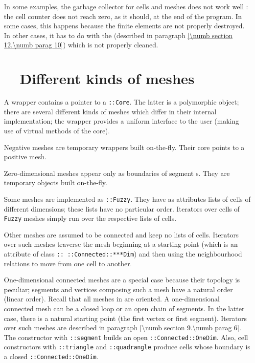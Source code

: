 In some examples, the garbage collector for cells and meshes does not work well :
the cell counter does not reach zero, as it should, at the end of the program.
In some cases, this happens because the finite elements are not properly destroyed.
In other cases, it has to do with the {\small\tt{}} (described in
paragraph \ref{\numb section 12.\numb parag 10}) which is not properly cleaned.


\section{~~Different kinds of meshes}\label{\numb section 11.\numb parag 6}   

A {\small\tt {}} wrapper contains a pointer to a {\small\tt {}::Core}.
The latter is a polymorphic object; there are several different kinds of meshes
which differ in their internal implementation; the wrapper provides a uniform interface
to the user (making use of virtual methods of the core).

Negative meshes are temporary wrappers built on-the-fly.
Their core points to a positive mesh.

Zero-dimensional meshes appear only as boundaries of segment {\small\tt {}}s.
They are temporary objects built on-the-fly.

Some meshes are implemented as {\small\tt {}::Fuzzy}.
They have as attributes lists of cells of different dimensions;
these lists have no particular order.
Iterators over cells of {\small\tt Fuzzy} meshes simply run over the respective lists of cells.

Other meshes are assumed to be connected and keep no lists of cells.
Iterators over such meshes traverse the mesh beginning at a starting point (which is an attribute
of class {\small\tt {}:: ::Connected::***Dim}) and then using the neighbourhood relations
to move from one cell to another.

One-dimensional connected meshes are a special case because their topology is peculiar;
segments and vertices composing such a mesh have a natural order (linear order).
Recall that all meshes in {\maniFEM} are oriented.
A one-dimensional connected mesh can be a closed loop or an open chain of segments.
In the latter case, there is a natural starting point (the first vertex or first segment).
Iterators over such meshes are described in paragraph \ref{\numb section 9.\numb parag 6}.
The {\small\tt {}} constructor with {\small\tt {}::segment} builds an open
{\small\tt {}::Connected::OneDim}.
Also, cell constructors with {\small\tt {}::triangle} and {\small\tt {}::quadrangle} produce cells
whose boundary is a closed {\small\tt {}::Connected::OneDim}.

